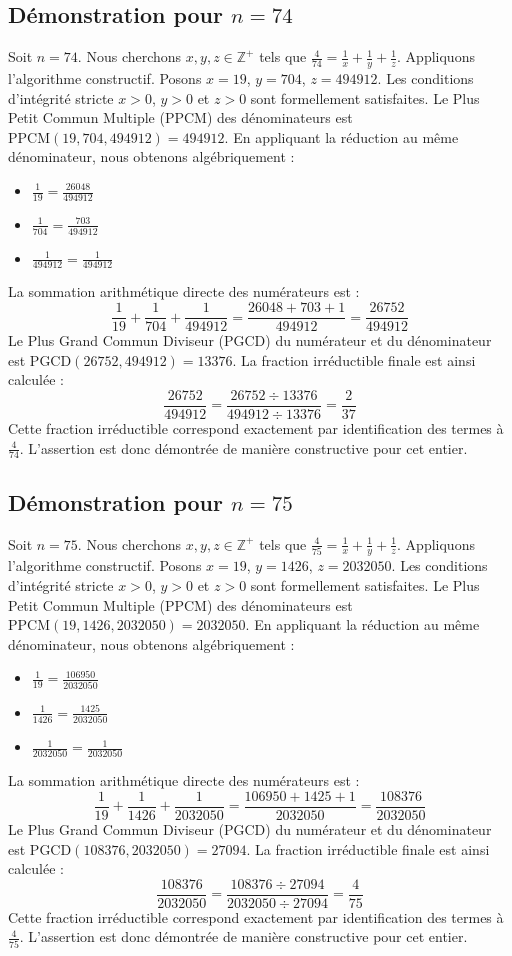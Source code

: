 \documentclass[11pt,a4paper]{article}
\begin{document}
\subsection{Démonstration pour $n = 74$}
Soit $n = 74$. Nous cherchons $x, y, z \in \mathbb{Z}^{+}$ tels que $\frac{4}{74} = \frac{1}{x} + \frac{1}{y} + \frac{1}{z}$.
Appliquons l'algorithme constructif. Posons $x = 19$, $y = 704$, $z = 494912$.
Les conditions d'intégrité stricte $x > 0$, $y > 0$ et $z > 0$ sont formellement satisfaites.
Le Plus Petit Commun Multiple (PPCM) des dénominateurs est $\text{PPCM}(19, 704, 494912) = 494912$.
En appliquant la réduction au même dénominateur, nous obtenons algébriquement :
\begin{itemize}
    \item $\frac{1}{19} = \frac{26048}{494912}$
    \item $\frac{1}{704} = \frac{703}{494912}$
    \item $\frac{1}{494912} = \frac{1}{494912}$
\end{itemize}
La sommation arithmétique directe des numérateurs est :
$$ \frac{1}{19} + \frac{1}{704} + \frac{1}{494912} = \frac{26048 + 703 + 1}{494912} = \frac{26752}{494912} $$
Le Plus Grand Commun Diviseur (PGCD) du numérateur et du dénominateur est $\text{PGCD}(26752, 494912) = 13376$.
La fraction irréductible finale est ainsi calculée :
$$ \frac{26752}{494912} = \frac{26752 \div 13376}{494912 \div 13376} = \frac{2}{37} $$
Cette fraction irréductible correspond exactement par identification des termes à $\frac{4}{74}$. L'assertion est donc démontrée de manière constructive pour cet entier.

\subsection{Démonstration pour $n = 75$}
Soit $n = 75$. Nous cherchons $x, y, z \in \mathbb{Z}^{+}$ tels que $\frac{4}{75} = \frac{1}{x} + \frac{1}{y} + \frac{1}{z}$.
Appliquons l'algorithme constructif. Posons $x = 19$, $y = 1426$, $z = 2032050$.
Les conditions d'intégrité stricte $x > 0$, $y > 0$ et $z > 0$ sont formellement satisfaites.
Le Plus Petit Commun Multiple (PPCM) des dénominateurs est $\text{PPCM}(19, 1426, 2032050) = 2032050$.
En appliquant la réduction au même dénominateur, nous obtenons algébriquement :
\begin{itemize}
    \item $\frac{1}{19} = \frac{106950}{2032050}$
    \item $\frac{1}{1426} = \frac{1425}{2032050}$
    \item $\frac{1}{2032050} = \frac{1}{2032050}$
\end{itemize}
La sommation arithmétique directe des numérateurs est :
$$ \frac{1}{19} + \frac{1}{1426} + \frac{1}{2032050} = \frac{106950 + 1425 + 1}{2032050} = \frac{108376}{2032050} $$
Le Plus Grand Commun Diviseur (PGCD) du numérateur et du dénominateur est $\text{PGCD}(108376, 2032050) = 27094$.
La fraction irréductible finale est ainsi calculée :
$$ \frac{108376}{2032050} = \frac{108376 \div 27094}{2032050 \div 27094} = \frac{4}{75} $$
Cette fraction irréductible correspond exactement par identification des termes à $\frac{4}{75}$. L'assertion est donc démontrée de manière constructive pour cet entier.
\end{document}

